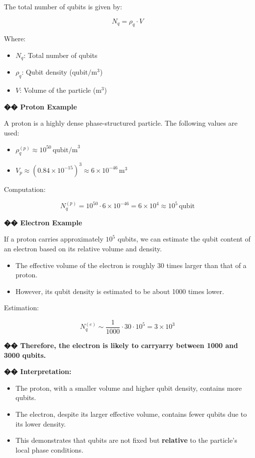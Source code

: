 \documentclass[12pt]{report} %
\begin{document}
\bigskip

The total number of qubits is given by:

\[
N_q = \rho_q \cdot V
\]

Where:
\begin{itemize}
  \item $N_q$: Total number of qubits
  \item $\rho_q$: Qubit density ($\text{qubit}/\text{m}^3$)
  \item $V$: Volume of the particle ($\text{m}^3$)
\end{itemize}

\bigskip

\textbf{�� Proton Example}

A proton is a highly dense phase-structured particle. The following values are used:

\begin{itemize}
  \item $\rho_q^{(p)} \approx 10^{50} \, \text{qubit/m}^3$
  \item $V_p \approx (0.84 \times 10^{-15})^3 \approx 6 \times 10^{-46} \, \text{m}^3$
\end{itemize}

Computation:

\[
N_q^{(p)} = 10^{50} \cdot 6 \times 10^{-46} = 6 \times 10^4 \approx \boxed{10^5} \, \text{qubit}
\]

\bigskip

\textbf{�� Electron Example}

If a proton carries approximately $10^5$ qubits, we can estimate the qubit content of an electron based on its relative volume and density.

\begin{itemize}
  \item The effective volume of the electron is roughly 30 times larger than that of a proton.
  \item However, its qubit density is estimated to be about 1000 times lower.
\end{itemize}

Estimation:

\[
N_q^{(e)} \sim \frac{1}{1000} \cdot 30 \cdot 10^5 = 3 \times \boxed10^3
\]

\textbf{�� Therefore, the electron is likely to carryarry between 1000 and 3000 qubits.}

\textbf{�� Interpretation:}

\begin{itemize}
  \item The proton, with a smaller volume and higher qubit density, contains more qubits.
  \item The electron, despite its larger effective volume, contains fewer qubits due to its lower density.
  \item This demonstrates that qubits are not fixed but \textbf{relative} to the particle’s local phase conditions.
\end{itemize}
\end{document}
